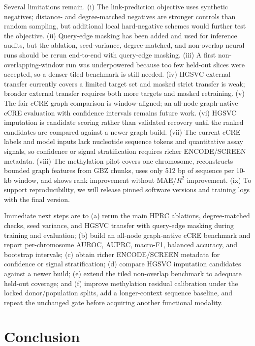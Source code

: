 \IfFileExists{ws-procs11x85.cls}{\worldscientificclasstrue\documentclass{ws-procs11x85}}{\worldscientificclassfalse\documentclass[11pt]{article}\usepackage[margin=1in]{geometry}}
\begin{document}
Several limitations remain. (i) The link-prediction objective uses synthetic
negatives; distance- and degree-matched negatives are stronger controls than
random sampling, but additional local hard-negative schemes would further test
the objective. (ii) Query-edge masking has been added and used for inference
audits, but the ablation, seed-variance, degree-matched, and non-overlap neural
runs should be rerun end-to-end with query-edge masking. (iii) A first
non-overlapping-window run was underpowered because too few held-out slices were
accepted, so a denser tiled benchmark is still needed. (iv) HGSVC external
transfer currently covers a limited target set and masked strict transfer is weak;
broader external transfer requires both more targets and masked retraining. (v)
The fair cCRE graph comparison is window-aligned; an all-node graph-native cCRE
evaluation with confidence intervals remains future work. (vi) HGSVC imputation
is candidate scoring rather than validated recovery until the ranked candidates
are compared against a newer graph build. (vii) The current cCRE labels and
model inputs lack nucleotide sequence tokens and quantitative assay signals, so
confidence or signal stratification requires richer ENCODE/SCREEN metadata.
(viii) The methylation pilot covers one chromosome, reconstructs bounded graph
features from GBZ chunks, uses only 512 bp of sequence per 10-kb window, and
shows rank improvement without MAE/$R^2$ improvement. (ix) To support
reproducibility, we will release pinned software versions and training logs with
the final version.

Immediate next steps are to (a) rerun the main HPRC ablations, degree-matched
checks, seed variance, and HGSVC transfer with query-edge masking during
training and evaluation; (b) build an all-node graph-native cCRE benchmark and
report per-chromosome AUROC, AUPRC, macro-F1, balanced accuracy, and bootstrap
intervals; (c) obtain richer ENCODE/SCREEN metadata for confidence or signal
stratification; (d) compare HGSVC imputation candidates against a newer build;
(e) extend the tiled non-overlap benchmark to adequate held-out coverage; and
(f) improve methylation residual calibration under the locked donor/population
splits, add a longer-context sequence baseline, and repeat the unchanged gate
before acquiring another functional modality.

\section{Conclusion}
\end{document}
